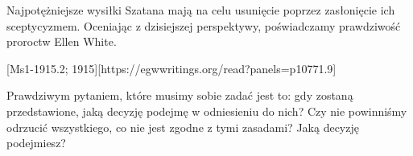 Najpotężniejsze wysiłki Szatana mają na celu usunięcie  poprzez zasłonięcie ich sceptycyzmem. Oceniając z dzisiejszej perspektywy, poświadczamy prawdziwość proroctw Ellen White.

[Ms1-1915.2; 1915][https://egwwritings.org/read?panels=p10771.9]

Prawdziwym pytaniem, które musimy sobie zadać  jest to: gdy  zostaną przedstawione, jaką decyzję podejmę w odniesieniu do nich? Czy nie powinniśmy odrzucić wszystkiego, co nie jest zgodne z tymi zasadami? Jaką decyzję podejmiesz?


